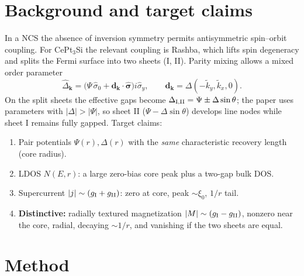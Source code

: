 \documentclass[11pt]{article}
\begin{document}
\section{Background and target claims}
In a NCS the absence of inversion symmetry permits antisymmetric spin--orbit
coupling. For CePt$_3$Si the relevant coupling is Rashba, which lifts spin
degeneracy and splits the Fermi surface into two sheets (I, II). Parity mixing
allows a mixed order parameter
\begin{equation}
\hat\Delta_{\bm k}=\bigl(\Psi\,\hat\sigma_0 + \bm d_{\bm k}\!\cdot\!\hat{\bm\sigma}\bigr)i\hat\sigma_y,
\qquad \bm d_{\bm k}=\Delta(-\tilde k_y,\tilde k_x,0).
\end{equation}
On the split sheets the effective gaps become
$\Delta_{\rm I,II}=\Psi\pm\Delta\sin\theta$; the paper uses parameters with
$|\Delta|>|\Psi|$, so sheet II ($\Psi-\Delta\sin\theta$) develops line nodes
while sheet I remains fully gapped. Target claims:
\begin{enumerate}
\item Pair potentials $\Psi(r),\Delta(r)$ with the \emph{same} characteristic
recovery length (core radius).
\item LDOS $N(E,r)$: a large zero-bias core peak plus a two-gap bulk DOS.
\item Supercurrent $|j|\sim(g_{\rm I}+g_{\rm II})$: zero at core, peak $\sim\xi_0$, $1/r$ tail.
\item \textbf{Distinctive:} radially textured magnetization $|M|\sim(g_{\rm
I}-g_{\rm II})$, nonzero near the core, radial, decaying $\sim1/r$, and
vanishing if the two sheets are equal.
\end{enumerate}

\section{Method}
\end{document}
